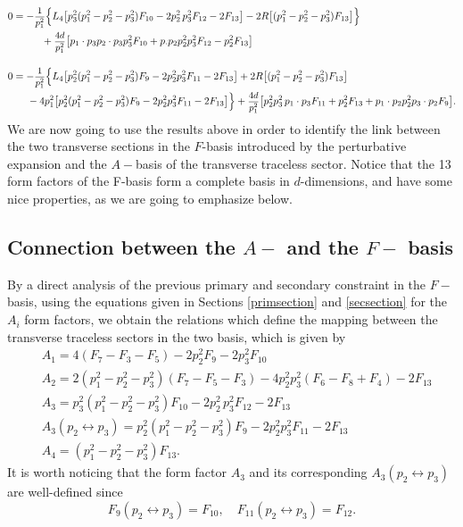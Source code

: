 \documentclass[a4paper,11pt,openright,twoside]{book}
\newcommand{\sdfrac}[2]{\mbox{\small$\displaystyle\frac{#1}{#2}$}}
\numberwithin{equation}{section}
\begin{document}
{{\begin{align}
	0&=-\sdfrac{1}{p_1^2}\Big\{L_4\big[p_3^2(p_1^2-p_2^2-p_3^2)F_{10}-2p_2^2\,p_3^2 F_{12}-2F_{13}\big]-2R\big[(p_1^2-p_2^2-p_3^2)F_{13}\big]\Big\}\notag\\
	&\hspace{1cm}+\sdfrac{4d}{p_1^2}\big[p_1\cdot p_3p_2\cdot p_3p_3^2F_{10}+p_\cdot p_2p_2^2p_3^2F_{12}-p_2^2F_{13}\big]\\[2.5ex]
	0&=-\sdfrac{1}{p_1^2}\Big\{L_4\big[p_2^2(p_1^2-p_2^2-p_3^2)F_9-2p_2^2p_3^2F_{11}-2F_{13}\big]+2R\big[(p_1^2-p_2^2-p_3^2)F_{13}\big]\notag\\
	&\hspace{0.5cm}-4p_1^2\big[p_2^2(p_1^2-p_2^2-p_3^2)F_9-2p_2^2p_3^2F_{11}-2F_{13}\big]\Big\}+\sdfrac{4d}{p_1^2}\big[p_2^2p_3^2\,p_1\cdot p_3 F_{11}+p_2^2F_{13}+p_1\cdot p_2 p_2^2 p_3\cdot p_2 F_9\big].
\end{align}
We are now going to use the results above in order to identify the link between the two transverse sections in the $F$-basis introduced by the perturbative expansion and the $A-$basis of the transverse traceless sector. Notice that the 13 form factors of the F-basis form a complete basis in $d$-dimensions, and have some nice properties, as we are going to emphasize below.

\subsection{Connection between the \texorpdfstring{$A-$}{} and the \texorpdfstring{$F-$}{} basis}
By a direct analysis of the previous primary and secondary constraint in the $F-$basis, using the equations given in Sections \ref{primsection} and \ref{secsection} for the 
$A_i$ form factors, we obtain the relations which define the mapping between the transverse traceless sectors in the two basis, which is given by
\begin{subequations}
	\begin{align}
		&A_1=4(F_7-F_3-F_5)-2p_2^2F_9-2p_3^2F_{10}\\
		&A_2=2(p_1^2-p_2^2-p_3^2)(F_7-F_5-F_3)-4p_2^2p_3^2(F_6-F_8+F_4)-2F_{13}\\
		&A_3=p_3^2(p_1^2-p_2^2-p_3^2)F_{10}-2p_2^2\,p_3^2 F_{12}-2F_{13}\\
		&A_3(p_2\leftrightarrow p_3)=p_2^2(p_1^2-p_2^2-p_3^2)F_9-2p_2^2p_3^2F_{11}-2F_{13}\\
		&A_4=(p_1^2-p_2^2-p_3^2)F_{13}.
	\end{align} \label{mapping}
\end{subequations}
It is worth noticing that the form factor $A_3$ and its corresponding $A_3(p_2\leftrightarrow p_3)$ are well-defined since 
\begin{equation}
	F_9(p_2\leftrightarrow p_3)=F_{10},\quad F_{11}(p_2\leftrightarrow p_3)=F_{12}.
\end{equation}

}}
\end{document}
